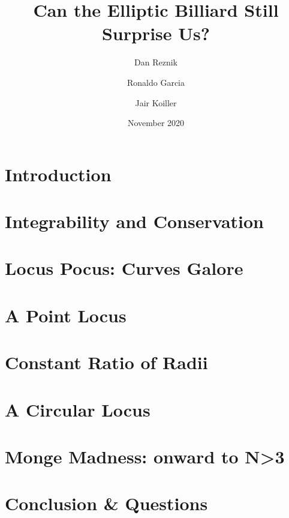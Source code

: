 \documentclass{svjour3}
\begin{document}
\title{Can the Elliptic Billiard Still Surprise Us?}
\author{Dan Reznik \and Ronaldo Garcia \and Jair Koiller}



\date{November 2020}

\maketitle



\section{Introduction}
\label{sec:intro}


\section{Integrability and Conservation}
\label{sec:integrability}


\section{Locus Pocus: Curves Galore}
\label{sec:loci}


\section{A Point Locus}
\label{sec:mitten}


\section{Constant Ratio of Radii}
\label{sec:cosines}


\section{A Circular Locus}
\label{sec:circles}


\section{Monge Madness: onward to N{\textgreater}3}
\label{sec:generalize}


\section{Conclusion \& Questions}
\label{sec:conclusion}




 

\end{document}
